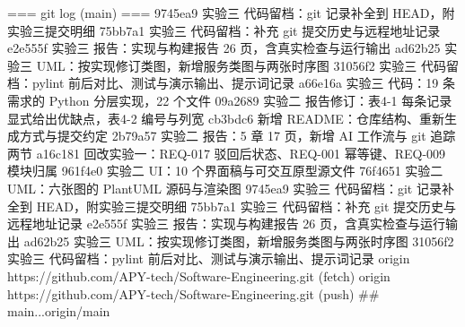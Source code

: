 === git log (main) ===
9745ea9 实验三 代码留档：git 记录补全到 HEAD，附实验三提交明细
75bb7a1 实验三 代码留档：补充 git 提交历史与远程地址记录
e2e555f 实验三 报告：实现与构建报告 26 页，含真实检查与运行输出
ad62b25 实验三 UML：按实现修订类图，新增服务类图与两张时序图
31056f2 实验三 代码留档：pylint 前后对比、测试与演示输出、提示词记录
a66e16a 实验三 代码：19 条需求的 Python 分层实现，22 个文件
09a2689 实验二 报告修订：表4-1 每条记录显式给出优缺点，表4-2 编号与列宽
cb3bdc6 新增 README：仓库结构、重新生成方式与提交约定
2b79a57 实验二 报告：5 章 17 页，新增 AI 工作流与 git 追踪两节
a16c181 回改实验一：REQ-017 驳回后状态、REQ-001 幂等键、REQ-009 模块归属
961f4e0 实验二 UI：10 个界面稿与可交互原型源文件
76f4651 实验二 UML：六张图的 PlantUML 源码与渲染图
9745ea9 实验三 代码留档：git 记录补全到 HEAD，附实验三提交明细
75bb7a1 实验三 代码留档：补充 git 提交历史与远程地址记录
e2e555f 实验三 报告：实现与构建报告 26 页，含真实检查与运行输出
ad62b25 实验三 UML：按实现修订类图，新增服务类图与两张时序图
31056f2 实验三 代码留档：pylint 前后对比、测试与演示输出、提示词记录
origin	https://github.com/APY-tech/Software-Engineering.git (fetch)
origin	https://github.com/APY-tech/Software-Engineering.git (push)
## main...origin/main
